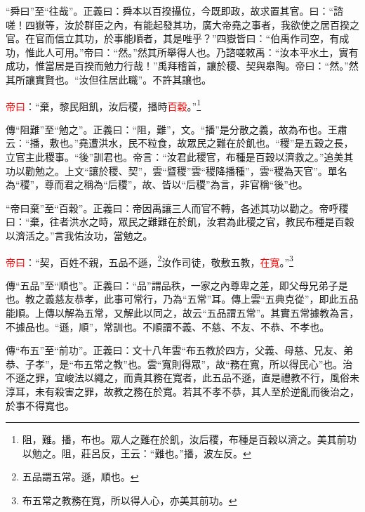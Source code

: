 {\noindent\shu{}\fzkt “舜曰”至“往哉”。正義曰：舜本以百揆攝位，今既即政，故求置其官。曰：“諮嗟！四嶽等，汝於群臣之內，有能起發其功，廣大帝堯之事者，我欲使之居百揆之官。在官而信立其功，於事能順者，其是唯乎？”四嶽皆曰：“伯禹作司空，有成功，惟此人可用。”帝曰：“然。”然其所舉得人也。乃諮嗟敕禹：“汝本平水土，實有成功，惟當居是百揆而勉力行哉！”禹拜稽首，讓於稷、契與皋陶。帝曰：“然。”然其所讓實賢也。“汝但往居此職”。不許其讓也。 \par}

\textcolor{red}{帝曰}：“棄，黎民阻飢，汝后稷，播時\textcolor{red}{百穀}。”\footnote{阻，難。播，布也。眾人之難在於飢，汝后稷，布種是百穀以濟之。美其前功以勉之。阻，莊呂反，王云：“難也。”播，波左反。}

{\noindent\zhuan{}\fzbyks 傳“阻難”至“勉之”。正義曰：“阻，難”，文。“播”是分散之義，故為布也。王肅云：“播，敷也。”堯遭洪水，民不粒食，故眾民之難在於飢也。“稷”是五穀之長，立官主此稷事。“後”訓君也。帝言：“汝君此稷官，布種是百穀以濟救之。”追美其功以勸勉之。上文“讓於稷、契”，雲“暨稷”雲“稷降播種”，雲“稷為天官”。單名為“稷”，尊而君之稱為“后稷”，故、皆以“后稷”為言，非官稱“後”也。 \par}

{\noindent\shu{}\fzkt “帝曰棄”至“百穀”。正義曰：帝因禹讓三人而官不轉，各述其功以勸之。帝呼稷曰：“棄，往者洪水之時，眾民之難難在於飢，汝君為此稷之官，教民布種是百穀以濟活之。”言我佑汝功，當勉之。 \par}

\textcolor{red}{帝曰}：“契，百姓不親，五品不遜，\footnote{五品謂五常。遜，順也。}汝作司徒，敬敷五教，\textcolor{red}{在寬}。”\footnote{布五常之教務在寬，所以得人心，亦美其前功。}

{\noindent\zhuan{}\fzbyks 傳“五品”至“順也”。正義曰：“品”謂品秩，一家之內尊卑之差，即父母兄弟子是也。教之義慈友恭孝，此事可常行，乃為“五常”耳。傳上雲“五典克從”，即此五品能順。上傳以解為五常，又解此以同之，故云“五品謂五常”。其實五常據教為言，不據品也。“遜，順”，常訓也。不順謂不義、不慈、不友、不恭、不孝也。 \par}

{\noindent\zhuan{}\fzbyks 傳“布五”至“前功”。正義曰：文十八年雲“布五教於四方，父義、母慈、兄友、弟恭、子孝”，是“布五常之教”也。雲“寬則得眾”，故“務在寬，所以得民心”也。治不遜之罪，宜峻法以繩之，而貴其務在寬者，此五品不遜，直是禮教不行，風俗未淳耳，未有殺害之罪，故教之務在於寬。若其不孝不恭，其人至於逆亂而後治之，於事不得寬也。 \par}

